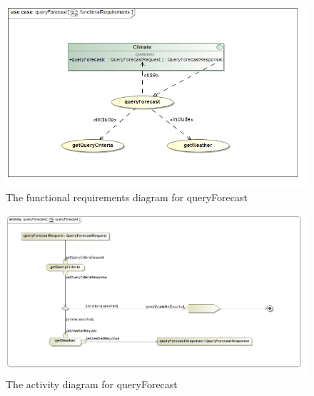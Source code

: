 \begin{figure}[H]
	\centering
	\includegraphics[width=1.0\textwidth]{../images/funcReq/queryForecastFunctionalRequirements.jpg}
	\caption{The functional requirements diagram for queryForecast \label{overflow}}
\end{figure}

\begin{figure}[H]
	\centering
	\includegraphics[width=1.0\textwidth]{../images/funcReq/queryForecastActivityDiagram.jpg}
	\caption{The activity diagram for queryForecast \label{overflow}}
\end{figure}